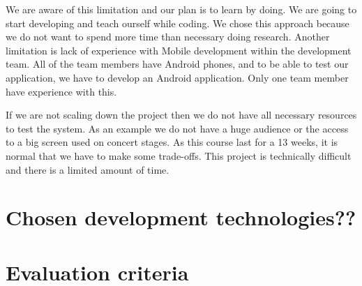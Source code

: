 We are aware of this limitation and our plan is to learn by doing.
We are going to start developing and teach ourself while coding.
We chose this approach because we do not want to spend more time than necessary doing research.
Another limitation is lack of experience with Mobile development within the
development team. All of the team members have Android phones, and to be
able to test our application, we have to develop an Android application. 
Only one team member have experience with this.

If we are not scaling down the project then we do not have all necessary resources to test the system.
As an example we do not have a huge audience or the access to a big screen used on concert stages.
As this course last for a 13 weeks, it is normal that we have to make some trade-offs.
This project is technically difficult and there is a limited amount of time.

\section{Chosen development technologies??}
\section{Evaluation criteria}